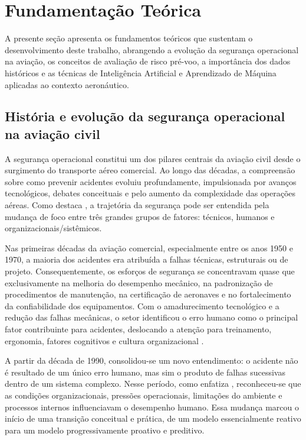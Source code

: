 \documentclass[english,brazilian]{UNISINOSartigo}
\begin{document}
\section{Fundamentação Teórica}

A presente seção apresenta os fundamentos teóricos que sustentam o
desenvolvimento deste trabalho, abrangendo a evolução da segurança operacional
na aviação, os conceitos de avaliação de risco pré-voo, a importância dos dados
históricos e as técnicas de Inteligência Artificial e Aprendizado de Máquina
aplicadas ao contexto aeronáutico.

\subsection{História e evolução da segurança operacional na aviação civil}

A segurança operacional constitui um dos pilares centrais da aviação civil desde
o surgimento do transporte aéreo comercial. Ao longo das décadas, a compreensão
sobre como prevenir acidentes evoluiu profundamente, impulsionada por avanços
tecnológicos, debates conceituais e pelo aumento da complexidade das operações
aéreas. Como destaca , a trajetória da segurança pode ser
entendida pela mudança de foco entre três grandes grupos de fatores: técnicos,
humanos e organizacionais/sistêmicos.

Nas primeiras décadas da aviação comercial, especialmente entre os anos 1950
e 1970, a maioria dos acidentes era atribuída a falhas técnicas, estruturais ou de
projeto. Consequentemente, os esforços de segurança se concentravam quase que
exclusivamente na melhoria do desempenho mecânico, na padronização de
procedimentos de manutenção, na certificação de aeronaves e no fortalecimento da
confiabilidade dos equipamentos. Com o amadurecimento tecnológico e a redução
das falhas mecânicas, o setor identificou o erro humano como o principal fator
contribuinte para acidentes, deslocando a atenção para treinamento, ergonomia,
fatores cognitivos e cultura organizacional \cite{HARMS2020,DEMIR2024}.

A partir da década de 1990, consolidou-se um novo entendimento: o acidente
não é resultado de um único erro humano, mas sim o produto de falhas sucessivas
dentro de um sistema complexo. Nesse período, como enfatiza ,
reconheceu-se que as condições organizacionais, pressões operacionais, limitações
do ambiente e processos internos influenciavam o desempenho humano. Essa
mudança marcou o início de uma transição conceitual e prática, de um modelo
essencialmente reativo para um modelo progressivamente proativo e preditivo.
\end{document}

